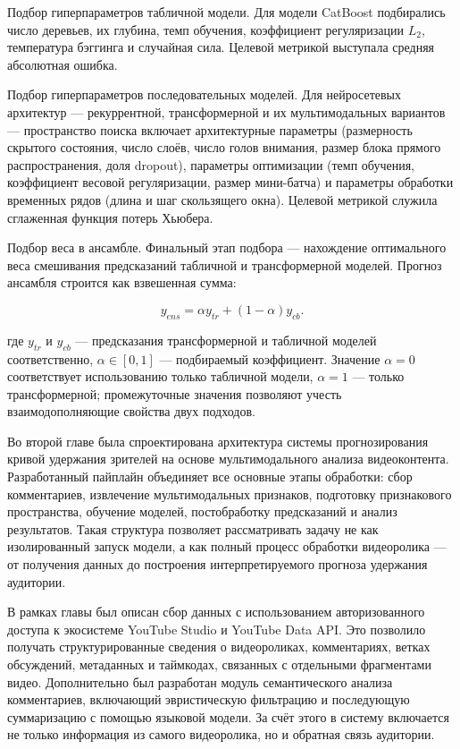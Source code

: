 \documentclass[times]{itmo-student-thesis}
\begin{document}
Подбор гиперпараметров табличной модели. Для модели CatBoost подбирались число деревьев, их глубина, темп обучения, коэффициент регуляризации $L_2$, температура бэггинга и случайная сила. Целевой метрикой выступала средняя абсолютная ошибка.

Подбор гиперпараметров последовательных моделей. Для нейросетевых архитектур — рекуррентной, трансформерной и их мультимодальных вариантов — пространство поиска включает архитектурные параметры (размерность скрытого состояния, число слоёв, число голов внимания, размер блока прямого распространения, доля dropout), параметры оптимизации (темп обучения, коэффициент весовой регуляризации, размер мини-батча) и параметры обработки временных рядов (длина и шаг скользящего окна). Целевой метрикой служила сглаженная функция потерь Хьюбера.

Подбор веса в ансамбле. Финальный этап подбора — нахождение оптимального веса смешивания предсказаний табличной и трансформерной моделей. Прогноз ансамбля строится как взвешенная сумма:

\[
y_{ens}=\alpha y_{tr}+(1-\alpha)y_{cb}.
\]

где $y_{tr}$ и $y_{cb}$ — предсказания трансформерной и табличной моделей соответственно, $\alpha\in[0,1]$ — подбираемый коэффициент. Значение $\alpha=0$ соответствует использованию только табличной модели, $\alpha=1$ — только трансформерной; промежуточные значения позволяют учесть взаимодополняющие свойства двух подходов.

\chapterconclusion

Во второй главе была спроектирована архитектура системы прогнозирования кривой удержания зрителей на основе мультимодального анализа видеоконтента. Разработанный пайплайн объединяет все основные этапы обработки: сбор комментариев, извлечение мультимодальных признаков, подготовку признакового пространства, обучение моделей, постобработку предсказаний и анализ результатов. Такая структура позволяет рассматривать задачу не как изолированный запуск модели, а как полный процесс обработки видеоролика — от получения данных до построения интерпретируемого прогноза удержания аудитории.

В рамках главы был описан сбор данных с использованием авторизованного доступа к экосистеме YouTube Studio и YouTube Data API. Это позволило получать структурированные сведения о видеороликах, комментариях, ветках обсуждений, метаданных и таймкодах, связанных с отдельными фрагментами видео. Дополнительно был разработан модуль семантического анализа комментариев, включающий эвристическую фильтрацию и последующую суммаризацию с помощью языковой модели. За счёт этого в систему включается не только информация из самого видеоролика, но и обратная связь аудитории.
\end{document}
